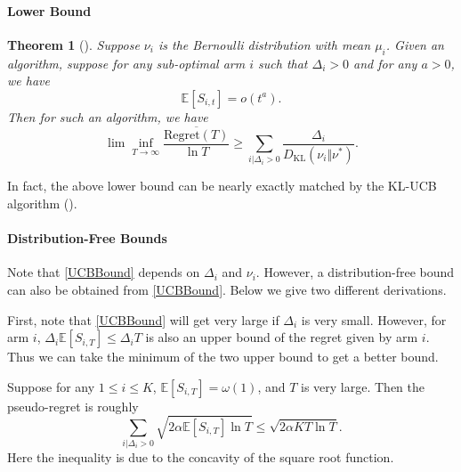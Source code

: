 \documentclass[openany]{book}
\newtheorem{theorem}{Theorem}[chapter]
\theoremstyle{definition}
\theoremstyle{remark}
\begin{document}
\paragraph{Lower Bound}
\begin{theorem}[\cite{LR85}]
    Suppose $\nu_i$ is the Bernoulli distribution with mean $\mu_i$. Given an algorithm, suppose for any sub-optimal arm $i$ such that $\Delta_i>0$ and for any $a>0$, we have
    \begin{equation}
        \mathbb{E}[S_{i,t}]=o(t^a).
    \end{equation}
    Then for such an algorithm, we have
    \begin{equation}
        \lim\inf_{T\to\infty}\frac{\overline{\mathrm{Regret}(T)}}{\ln T}\ge \sum_{i|\Delta_i>0}^{}\frac{\Delta_i}{D_{\mathrm{KL}}(\nu_i\Vert\nu^*)}.
    \end{equation}
\end{theorem}
In fact, the above lower bound can be nearly exactly matched by the KL-UCB algorithm (\cite{GC11}\cite{MMS11}).

\paragraph{Distribution-Free Bounds}
Note that \eqref{UCBBound} depends on $\Delta_i$ and $\nu_i$. However, a distribution-free bound can also be obtained from \eqref{UCBBound}. Below we give two different derivations.

First, note that \eqref{UCBBound} will get very large if $\Delta_i$ is very small. However, for arm $i$, $\Delta_i \mathbb{E}[S_{i,T}]\le\Delta_iT$ is also an upper bound of the regret given by arm $i$. Thus we can take the minimum of the two upper bound to get a better bound.

Suppose for any $1\le i\le K$, $\mathbb{E}[S_{i,T}]=\omega(1)$, and $T$ is very large. Then the pseudo-regret is roughly
\begin{equation}
    \sum_{i|\Delta_i>0}^{}\sqrt{2\alpha \mathbb{E}[S_{i,T}]\ln T}\le\sqrt{2\alpha KT\ln T}.
\end{equation}
Here the inequality is due to the concavity of the square root function.
\end{document}
